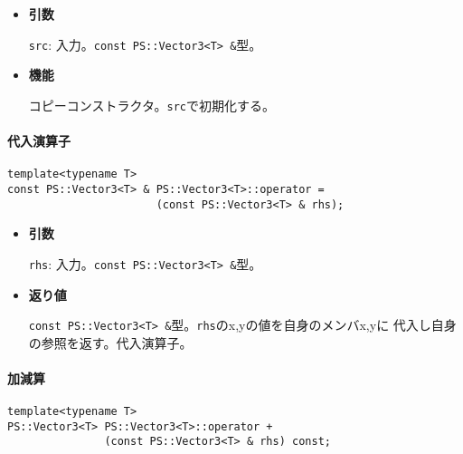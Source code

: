 \begin{itemize}

\item{{\bf 引数}}

{\tt src}: 入力。{\tt const PS::Vector3<T> \&}型。

\item{{\bf 機能}}

コピーコンストラクタ。{\tt src}で初期化する。

\end{itemize}

\paragraph{代入演算子}
\mbox{}

\begin{screen}
\begin{verbatim}
template<typename T>
const PS::Vector3<T> & PS::Vector3<T>::operator = 
                       (const PS::Vector3<T> & rhs);
\end{verbatim}
\end{screen}

\begin{itemize}

\item{{\bf 引数}}

{\tt rhs}: 入力。{\tt const PS::Vector3<T> \&}型。

\item{{\bf 返り値}}

{\tt const PS::Vector3<T> \&}型。{\tt rhs}のx,yの値を自身のメンバx,yに
代入し自身の参照を返す。代入演算子。

\end{itemize}


\paragraph{加減算}
\mbox{}

\begin{screen}
\begin{verbatim}
template<typename T>
PS::Vector3<T> PS::Vector3<T>::operator + 
               (const PS::Vector3<T> & rhs) const;
\end{verbatim}
\end{screen}

